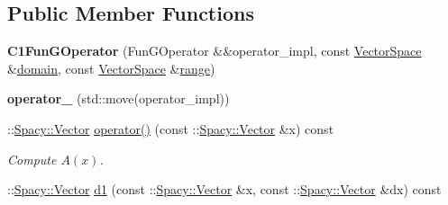 \subsection*{\-Public \-Member \-Functions}
\begin{DoxyCompactItemize}
\item 
\hypertarget{classSpacy_1_1dealII_1_1C1FunGOperator_a45fe81925630852eaa8ac4acc1effc00}{{\bfseries \-C1\-Fun\-G\-Operator} (\-Fun\-G\-Operator \&\&operator\-\_\-impl, const \hyperlink{classSpacy_1_1VectorSpace}{\-Vector\-Space} \&\hyperlink{classSpacy_1_1OperatorBase_a2588f9b3e0188820c4c494e63293dc6f}{domain}, const \hyperlink{classSpacy_1_1VectorSpace}{\-Vector\-Space} \&\hyperlink{classSpacy_1_1OperatorBase_ab19d3b7a6f290b1079248f1e567e53d6}{range})}\label{classSpacy_1_1dealII_1_1C1FunGOperator_a45fe81925630852eaa8ac4acc1effc00}

\item 
\hypertarget{classSpacy_1_1dealII_1_1C1FunGOperator_ac452cdc0965cd00152cc0ab683c2d574}{{\bfseries operator\-\_\-} (std\-::move(operator\-\_\-impl))}\label{classSpacy_1_1dealII_1_1C1FunGOperator_ac452cdc0965cd00152cc0ab683c2d574}

\item 
\hypertarget{classSpacy_1_1dealII_1_1C1FunGOperator_a22f45eb52fe6d89516e3f63ab59af207}{\-::\hyperlink{classSpacy_1_1Vector}{\-Spacy\-::\-Vector} \hyperlink{classSpacy_1_1dealII_1_1C1FunGOperator_a22f45eb52fe6d89516e3f63ab59af207}{operator()} (const \-::\hyperlink{classSpacy_1_1Vector}{\-Spacy\-::\-Vector} \&x) const }\label{classSpacy_1_1dealII_1_1C1FunGOperator_a22f45eb52fe6d89516e3f63ab59af207}

\begin{DoxyCompactList}\small\item\em \-Compute $A(x)$. \end{DoxyCompactList}\item 
\hypertarget{classSpacy_1_1dealII_1_1C1FunGOperator_aaf6eca6d41b90ca1e948bd580f48575f}{\-::\hyperlink{classSpacy_1_1Vector}{\-Spacy\-::\-Vector} \hyperlink{classSpacy_1_1dealII_1_1C1FunGOperator_aaf6eca6d41b90ca1e948bd580f48575f}{d1} (const \-::\hyperlink{classSpacy_1_1Vector}{\-Spacy\-::\-Vector} \&x, const \-::\hyperlink{classSpacy_1_1Vector}{\-Spacy\-::\-Vector} \&dx) const }\label{classSpacy_1_1dealII_1_1C1FunGOperator_aaf6eca6d41b90ca1e948bd580f48575f}


\end{DoxyCompactItemize}
